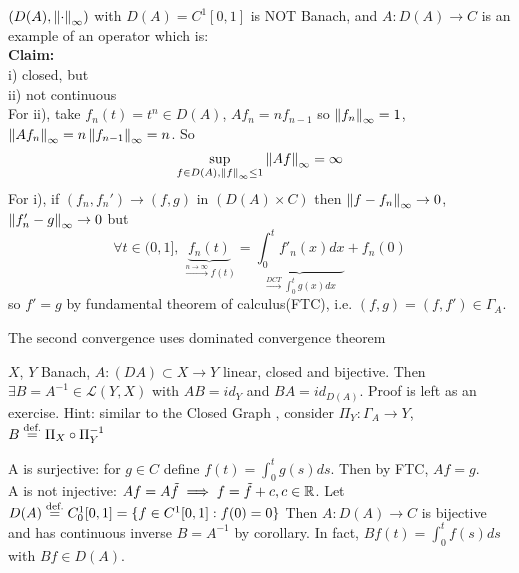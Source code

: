 \documentclass{article}
\begin{document}
\begin{example}\nl
	$(D(A),\left\|{\cdot}\right\|_\infty)$ with $D(A)=C^1[0,1]$ is NOT Banach, and $A:D(A)\to C$ is an example of an operator which is:\\
	\textbf{Claim: }\\
	i) closed, but\\
	ii) not continuous\\
	For ii), take $f_n(t)=t^n\in D(A)$, $Af_n=nf_{n-1}$ so $\left\|{f_n}\right\|_\infty=1$, $\left\|{Af_n}\right\|_\infty=n\left\|{f_{n-1}}\right\|_\infty=n$. So 
	$$ \sup_{f\in D(A),\left\|{f}\right\|_\infty\leq1}\left\|{Af}\right\|_\infty=\infty$$
	For i), if $(f_n,f_n')\to(f,g)$ in $(D(A)\times C)$ then $\left\|{f-f_n}\right\|_\infty\to 0$, $\left\|{f_n'-g}\right\|_\infty\to0$ but
	$$
	\forall t\in(0,1],\,\underbrace{f_n(t)}_{\overset{n\to\infty}{\longrightarrow}f(t)}
	=\underbrace{\int_0^t f'_n(x) dx}_{\overset{DCT}{\longrightarrow}\int_0^t g(x) dx}
	+f_n(0)
	$$
	so $f'=g$ by fundamental theorem of calculus(FTC), i.e. $(f,g)=(f,f')\in\Gamma_A$. 
 \begin{unexaminable}
The second convergence uses dominated convergence theorem
 \end{unexaminable}
\end{example}


\begin{corollary}\nl
	$X$, $Y$ Banach, $A:(DA)\subset X\to Y$ linear, closed and bijective. Then $\exists B=A^{-1}\in\mathcal{L}(Y,X)$ with $AB=id_Y$ and $BA=id_{D(A)}$.
	Proof is left as an exercise. Hint: similar to the Closed Graph , consider $\Pi_Y:\Gamma_A\to Y$, $B\stackrel{\text{def.}}{=}\Pi_X\circ \Pi_Y^{-1}$
	
\end{corollary}

\begin{example}[???]\nl
	A is surjective: for $g\in C$ define $f(t)=\int_0^t g(s) ds$. Then by FTC, $Af=g$.\\
	A is not injective: $Af=A\tilde{f}\implies f=\tilde{f}+c,c\in\mathbb{R}$. 
	Let $D(A)\stackrel{\text{def.}}{=} C_0^1[0,1]=\{f\in C^1[0,1]:f(0)=0\}$
	Then $A:D(A)\to C$ is bijective and has continuous inverse $B=A^{-1}$ by corollary. In fact, $Bf(t)=\int_0^tf(s)ds$ with $Bf\in D(A)$.
\end{example}
\end{document}
